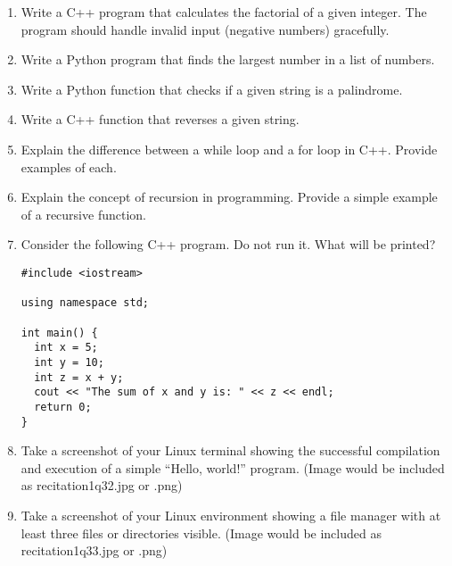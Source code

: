 \documentclass{article}
\begin{document}
\begin{enumerate}
    \item Write a C++ program that calculates the factorial of a given integer. The program should handle invalid input (negative numbers) gracefully.


    \item Write a Python program that finds the largest number in a list of numbers.


    \item Write a Python function that checks if a given string is a palindrome.


    \item Write a C++ function that reverses a given string.


    \item Explain the difference between a while loop and a for loop in C++.  Provide examples of each.


    \item Explain the concept of recursion in programming. Provide a simple example of a recursive function.


    \item  Consider the following C++ program. Do not run it.  What will be printed?
    \begin{verbatim}
#include <iostream>

using namespace std;

int main() {
  int x = 5;
  int y = 10;
  int z = x + y;
  cout << "The sum of x and y is: " << z << endl;
  return 0;
}
    \end{verbatim}


    \item Take a screenshot of your Linux terminal showing the successful compilation and execution of a simple “Hello, world!” program. (Image would be included as recitation1q32.jpg or .png)

    \item  Take a screenshot of your Linux environment showing a file manager with at least three files or directories visible. (Image would be included as recitation1q33.jpg or .png)
\end{enumerate}
\end{document}
